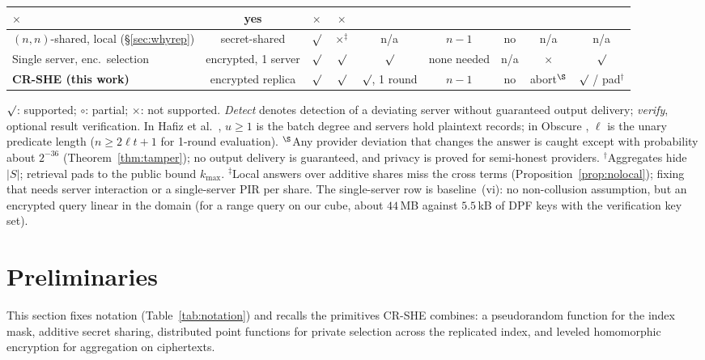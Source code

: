\documentclass[a4paper,fleqn]{cas-sc}
\providecommand{\checkmark}{\ensuremath{\surd}}
\begin{document}
\begin{table}[pos=t,width=\textwidth]
\begin{tabular*}{\tblwidth}{@{\extracolsep{\fill}}lcccccccc@{}}
$\times$ & yes & $\times$ & $\times$ \\
\midrule
$(n,n)$-shared, local (\S\ref{sec:whyrep}) & secret-shared & $\checkmark$ &
$\times^{\ddagger}$ & n/a & $n-1$ & no & n/a & n/a \\
Single server, enc.\ selection & encrypted, 1 server & $\checkmark$ &
$\checkmark$ & $\checkmark$ & none needed & n/a & $\times$ & $\checkmark$ \\
\textbf{CR-SHE (this work)} & encrypted replica & $\checkmark$ & $\checkmark$ &
$\checkmark$, 1 round & $n-1$ & no & abort$^{\S}$ & $\checkmark$ / pad$^{\dagger}$ \\
\bottomrule
\end{tabular*}
\vspace{3pt}
\begin{flushleft}
\footnotesize
$\checkmark$: supported; $\circ$: partial; $\times$: not supported.
\emph{Detect} denotes detection of a deviating server without guaranteed
output delivery; \emph{verify}, optional result verification.
In Hafiz et al.\ \citep{hafiz2024private}, $u\ge 1$ is the batch degree and
servers hold plaintext records; in Obscure \citep{gupta2020obscure}, $\ell$
is the unary predicate length ($n \ge 2\ell t + 1$ for 1-round evaluation). $^{\S}$Any provider deviation that changes the answer is caught
except with probability about $2^{-36}$ (Theorem~\ref{thm:tamper}); no output
delivery is guaranteed, and privacy is proved for semi-honest providers. $^{\dagger}$Aggregates hide $|S|$; retrieval pads to the
public bound $k_{\max}$. $^{\ddagger}$Local answers over additive shares miss
the cross terms (Proposition~\ref{prop:nolocal}); fixing that needs server
interaction or a single-server PIR per share. The single-server row is
baseline~(vi): no non-collusion assumption, but an encrypted query linear in
the domain (for a range query on our cube, about $44$\,MB against $5.5$\,kB of
DPF keys with the verification key set).
\end{flushleft}
\end{table}

\section{Preliminaries}
\label{sec:prelim}

This section fixes notation (Table~\ref{tab:notation}) and recalls the
primitives CR-SHE combines: a pseudorandom function for the index mask,
additive secret sharing, distributed point functions for private selection
across the replicated index, and leveled homomorphic encryption for
aggregation on ciphertexts.
\end{document}
